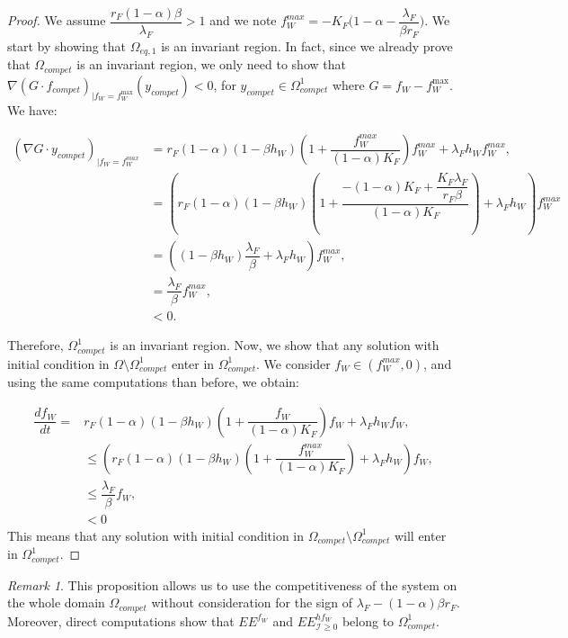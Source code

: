 \documentclass{article}
\newcommand{\lfw}{\lambda_{F}}
\newcommand{\lfw}{\lambda_{F}}
\newcommand{\cI}{\mathcal{I}}
\theoremstyle{definition}
\theoremstyle{remark}
\newtheorem{remark}[theorem]{Remark}
\begin{document}
\begin{proof}
We assume $\dfrac{r_F(1-\alpha) \beta}{\lfw} > 1$ and we note $f_W^{max} = -K_F\Big(1-\alpha - \dfrac{ \lfw}{\beta r_F}\Big)$.
We start by showing that $\Omega_{eq, 1}$ is an invariant region. In fact, since we already prove that $\Omega_{compet}$ is an invariant region, we only need to show that 
$\nabla (G \cdot f_{compet})_{|f_W = f_W^{\max}}(y_{compet}) < 0$, for $y_{compet} \in \Omega_{compet}^1$ where $G = f_W - f_W^{\max}$. We have:

\begin{align*}
(\nabla G \cdot y_{compet})_{|f_W = f_W^{max}} &= r_F(1-\alpha)(1-\beta h_W) \left(1 + \dfrac{f_W^{max}}{(1-\alpha) K_F} \right)f_W^{max} + \lfw h_W f^{max}_W, \\
&= \left(r_F(1-\alpha)(1-\beta h_W) \left(1 + \dfrac{-(1-\alpha) K_F + \dfrac{K_F \lfw}{r_F \beta}}{(1-\alpha) K_F}\right) + \lfw h_W \right) f^{max}_W \\
&= \left((1-\beta h_W)\dfrac{\lfw}{\beta} + \lfw h_W \right) f^{max}_W, \\
&= \dfrac{\lfw}{\beta} f_W^{max}, \\
&< 0.
\end{align*}

Therefore, $\Omega_{compet}^1$ is an invariant region. Now, we show that any solution with initial condition in $\Omega \setminus \Omega_{compet}^1$ enter in $\Omega_{compet}^1$. We consider $f_W \in (f_W^{max}, 0)$, and using the same computations than before, we obtain:

\begin{align*}
\dfrac{df_W}{dt} = &r_F(1-\alpha)(1-\beta h_W) \left(1 + \dfrac{f_W}{(1-\alpha) K_F}\right)f_W + \lfw h_W  f_W, \\
& \leq \left(r_F(1-\alpha)(1-\beta h_W) \left(1 + \dfrac{f_W^{max}}{(1-\alpha) K_F}\right) + \lfw h_W  \right) f_W, \\
& \leq \dfrac{\lfw}{\beta} f_W,\\
&< 0
\end{align*}
This means that any solution with initial condition in $\Omega_{compet} \setminus \Omega_{compet}^1$ will enter in $\Omega_{compet}^1$.
\end{proof}

\begin{remark} \label{remark:competitivity}
This proposition allows us to use the competitiveness of the system on the whole domain $\Omega_{compet}$ without consideration for the sign of $\lfw - (1-\alpha)\beta r_F$. Moreover, direct computations show that $EE^{f_W}$ and $EE^{hf_W}_{\cI \geq 0}$ belong to $\Omega_{compet}^1$.
\end{remark}
\end{document}
